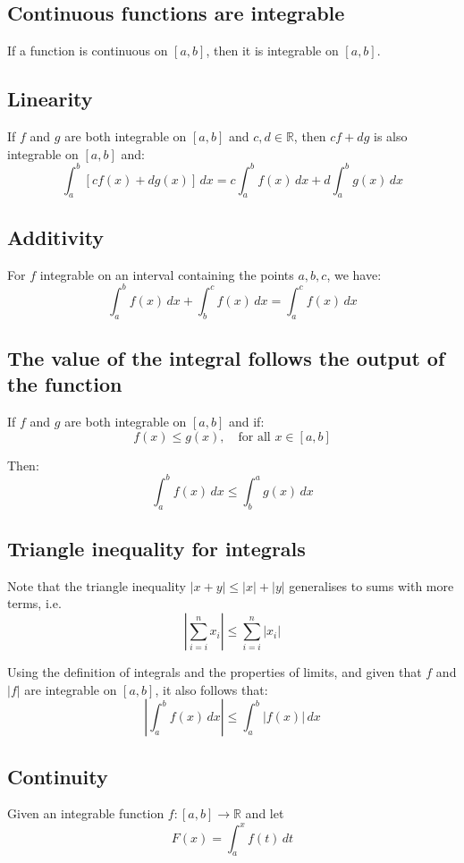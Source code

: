 \documentclass[11pt]{article}
\begin{document}
\subsection{Continuous functions are integrable}
\label{sec:org974ea41}
If a function is continuous on \([a, b]\), then it is integrable on \([a, b]\).

\subsection{Linearity}
\label{sec:orga834d99}
If \(f\) and \(g\) are both integrable on \([a, b]\) and \(c, d \in \mathbb{R}\), then \(cf + dg\) is also integrable on \([a, b]\) and:
\[\int_a^b [cf(x) + dg(x)] \, dx = c \int_a^b f(x) \, dx + d \int_a^b g(x) \, dx\]

\subsection{Additivity}
\label{sec:org0c30d33}
For \(f\) integrable on an interval containing the points \(a, b, c\), we have:
\[\int_a^b f(x) \, dx + \int_b^c f(x) \, dx = \int_a^c f(x) \, dx\]

\subsection{The value of the integral follows the output of the function}
\label{sec:orga50a23b}
If \(f\) and \(g\) are both integrable on \([a, b]\) and if:
\[f(x) \le g(x), \quad \text{for all } x \in [a, b]\]

Then:
\[\int_a^b f(x) \, dx \le \int_b^a g(x) \, dx\]

\subsection{Triangle inequality for integrals}
\label{sec:orgb7aa8be}
Note that the triangle inequality \(|x + y| \le |x| + |y|\) generalises to sums with more terms, i.e.
\[\left| \sum_{i = i}^n x_i \right| \le \sum_{i = i}^n |x_i|\]

Using the definition of integrals and the properties of limits, and given that \(f\) and \(|f|\) are integrable on \([a, b]\), it also follows that:
\[\left| \int_a^b f(x) \, dx \right| \le \int_a^b |f(x)| \, dx\]

\subsection{Continuity}
\label{sec:orgcb06f3b}
Given an integrable function \(f : [a, b] \rightarrow \mathbb{R}\) and let
\[F(x) = \int_a^x f(t) \, dt\]
\end{document}
